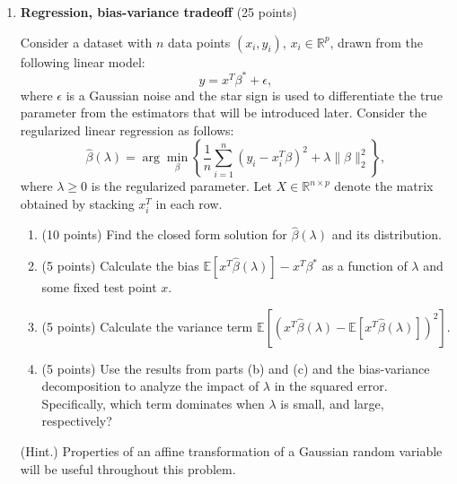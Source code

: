 \documentclass[twoside,12pt]{article}
\begin{document}
\begin{enumerate}
\clearpage

\item{\bf Regression, bias-variance tradeoff} (25 points)


Consider a dataset with $n$ data points $(x_i, y_i)$, $x_i \in \mathbb R^p$, drawn from the following linear model:
\[
y = x^T {\beta^*} + \epsilon,
\]
where $\epsilon$ is a Gaussian noise and the star sign is used to differentiate the true parameter from the estimators that will be introduced later. Consider the regularized linear regression as follows:
\[
\hat \beta(\lambda) 
= \arg\min_{\beta}
\left\{
\frac 1 n \sum_{i=1}^n (y_i -x_i^T \beta)^2 + \lambda \|\beta\|_2^2
\right\},
\]
where $\lambda \geq 0$ is the regularized parameter. Let $X\in \mathbb R^{n\times p}$ denote the matrix obtained by stacking $x_i^T$ in each row. 
\begin{enumerate}
\item (10 points) Find the closed form solution for $\hat \beta(\lambda)$ and its distribution.
\item (5 points) Calculate the bias  $\mathbb E[x^T {\hat \beta}(\lambda)] - x^T {\beta^*}$ as a function of $\lambda$ and some fixed test point $x$.
\item (5 points) Calculate the variance term $\mathbb E\left[\left(x^T {\hat \beta}(\lambda) - \mathbb E[x^T {\hat \beta}(\lambda)] \right)^2\right]$.
\item (5 points) Use the results from parts (b) and (c) and the bias-variance decomposition to analyze the impact of $\lambda$ in the squared error. Specifically, which term dominates when $\lambda$ is small, and large, respectively?
\end{enumerate}


(Hint.) Properties of an affine transformation of a Gaussian random variable will be useful throughout this problem.

\end{enumerate}
\end{document}
